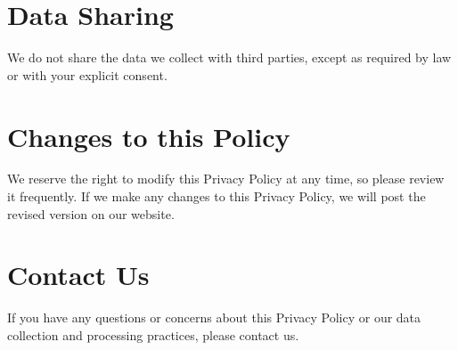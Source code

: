\section*{Data Sharing}

We do not share the data we collect with third parties, except as required by law or with your explicit consent.

\section*{Changes to this Policy}

We reserve the right to modify this Privacy Policy at any time, so please review it frequently. If we make any changes to this Privacy Policy, we will post the revised version on our website.

\section*{Contact Us}

If you have any questions or concerns about this Privacy Policy or our data collection and processing practices, please contact us.